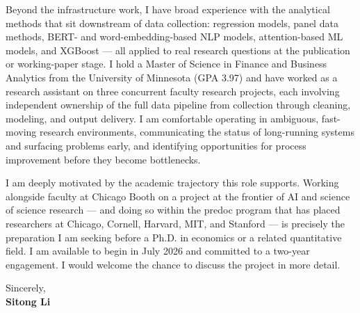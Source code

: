 \documentclass[12pt]{article}
\begin{document}
Beyond the infrastructure work, I have broad experience with the analytical methods that sit downstream of data collection: regression models, panel data methods, BERT- and word-embedding-based NLP models, attention-based ML models, and XGBoost --- all applied to real research questions at the publication or working-paper stage. I hold a Master of Science in Finance and Business Analytics from the University of Minnesota (GPA 3.97) and have worked as a research assistant on three concurrent faculty research projects, each involving independent ownership of the full data pipeline from collection through cleaning, modeling, and output delivery. I am comfortable operating in ambiguous, fast-moving research environments, communicating the status of long-running systems and surfacing problems early, and identifying opportunities for process improvement before they become bottlenecks.

I am deeply motivated by the academic trajectory this role supports. Working alongside faculty at Chicago Booth on a project at the frontier of AI and science of science research --- and doing so within the predoc program that has placed researchers at Chicago, Cornell, Harvard, MIT, and Stanford --- is precisely the preparation I am seeking before a Ph.D. in economics or a related quantitative field. I am available to begin in July 2026 and committed to a two-year engagement. I would welcome the chance to discuss the project in more detail.

\vspace{1em}

\noindent Sincerely,\\[0.5em]
\textbf{Sitong Li}
\end{document}
